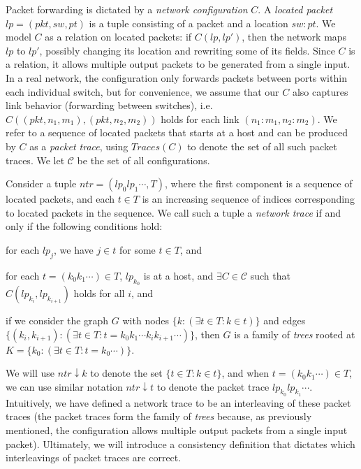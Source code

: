 \documentclass[pldi-cameraready]{sigplanconf}
\newcommand{\port}{\ensuremath{\mathit{pt}}}
\newcommand{\switch}{\ensuremath{\mathit{sw}}}
\newcommand{\lpt}{\ensuremath{\mathit{lp}}}
\newcommand{\ntr}{\ensuremath{\mathit{ntr}}}
\newcommand{\pkt}{\ensuremath{\mathit{pkt}}}
\newcommand{\PTraces}{\ensuremath{\mathit{Traces}}}
\begin{document}
Packet forwarding is dictated by a {\em network
  configuration} $C$. A {\em located packet}
$\lpt=(\pkt,\switch,\port)$ is a tuple consisting of a packet and a location
$\switch{:}\port$. We model $C$ as a
relation on located packets: if $C(\lpt,\lpt')$, then the network maps
$\lpt$ to $\lpt'$, possibly changing its location and rewriting some
of its fields.
Since $C$ is a relation, it allows multiple output packets to be generated from a single input.
{In a real network, the configuration only forwards packets between ports within each individual switch,
but for convenience, we}
assume that our $C$ also captures link behavior (forwarding between switches),
i.e. $C((\pkt,n_1,m_1),(\pkt,n_2,m_2))$ holds for each link $(n_1{:}m_1,n_2{:}m_2)$.
We refer to a sequence of located packets that starts at a host and can be
produced by $C$ as a {\em packet trace}, 
using $\PTraces(C)$ to denote the set of all such packet traces.
We let $\mathcal{C}$ be the set of all configurations.

Consider a tuple $\ntr = (\lpt_0\lpt_1\cdots,T)$, where the first component is a sequence of located
packets, and each $t \in T$ is an increasing sequence of indices corresponding to
located packets in the sequence.
We call such a tuple a {\em network trace} if and only if the following conditions hold:
\begin{compactenum}
\item for each $\lpt_j$, we have $j \in t$ for some $t \in T$, and
\item for each $t = (k_0 k_1 \cdots) \in T$,
$\lpt_{k_0}$ is at a host, and $\exists C \in \mathcal{C}$ such that $C(\lpt_{k_i},\lpt_{k_{i+1}})$ holds for all $i$, and
\item if we consider the graph $G$ with nodes $\{k : (\exists t\in T : k \in t)\}$ and
edges $\{ (k_i,k_{i+1}) : (\exists t\in T : t = k_0 k_1 \cdots k_i k_{i+1} \cdots)\}$,
then $G$ is a family of {\em trees} rooted at $K = \{k_0 : (\exists t \in T : t = k_0 \cdots)\}$.
\end{compactenum}
We will use $\ntr{\downarrow}k$ to denote
the set $\{t \in T : k \in t\}$, and when $t = (k_0 k_1 \cdots) \in T$, we
can use similar notation $\ntr{\downarrow}t$ to denote the packet trace $\lpt_{k_0} \lpt_{k_1} \cdots$.
Intuitively, we have defined a network trace to be an interleaving of
these packet traces
{(the packet traces form the family of {\em trees}
because, as previously mentioned, the configuration allows multiple
output packets from a single input packet).}
Ultimately, we will introduce a consistency definition that
dictates which interleavings of packet traces are correct.
\end{document}
